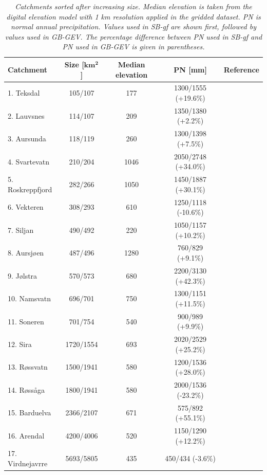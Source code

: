 \documentclass[12pt,a4paper,english]{article}
\begin{document}
\begin{table}[hbtp]
  \begin{tabular}{|l|c|c|c|c|}
    \hline
    \hline
    \textbf{Catchment} & \textbf{Size [$\mathbf{km^2}$] } & \textbf{Median elevation} & \textbf{PN [mm]} & \textbf{Reference} \\
	\hline
	1. Teksdal & 105/107 & 177 & 1300/1555 (+19.6\%) & \cite{Forland1997}\\
	\hline
	2. Lauvsnes & 114/107 & 209 & 1350/1380 (+2.2\%) & \cite{Isaksen2006}\\
	\hline
	3. Aursunda & 118/119 & 260 & 1300/1398 (+7.5\%) & \cite{Mamen2009}\\
	\hline
	4. Svartevatn & 210/204 & 1046 & 2050/2748 (+34.0\%) & \cite{Forland1991b} \\
	\hline
	5. Roskreppfjord & 282/266 & 1050 & 1450/1887 (+30.1\%) & \cite{Forland1991b}\\
	\hline
	6. Vekteren & 308/293 & 610 & 1250/1118 (-10.6\%) & \cite{Forland1991a}\\
	\hline
	7. Siljan & 490/492 & 220 & 1050/1157 (+10.2\%) & \cite{Forland1986b}\\
	\hline
	8. Aursj{\o}en & 487/496 & 1280 & 760/829 (+9.1\%) & \cite{Hanssen-Bauer1992}\\
	\hline
	9. J{\o}lstra & 570/573 & 680 & 2200/3130 (+42.3\%) & \cite{Forland1986a}\\
	\hline
	10. Namsvatn & 696/701 & 750 & 1300/1151 (+11.5\%) & \cite{Forland1991a}\\
	\hline
	11. Soneren & 701/754 & 540 & 900/989 (+9.9\%) & \cite{Hanssen-Bauer1991}\\
	\hline
	12. Sira & 1720/1554 & 693 & 2020/2529 (+25.2\%) & \cite{Forland1991b}\\
	\hline
	13. R{\o}ssvatn & 1500/1941 & 580 & 1200/1536 (+28.0\%) & \cite{Forland1988} \\
	\hline
	14. R{\o}ss{\aa}ga & 1800/1941 & 580 & 2000/1536 (-23.2\%) & \cite{Mamen2011b} \\
	\hline
	15. Barduelva & 2366/2107 & 671 & 575/892 (+55.1\%) & \cite{Forland1990b}\\
	\hline
	16. Arendal & 4200/4006 & 520 & 1150/1290 (+12.2\%) & \cite{Mamen2011a}\\
	\hline
	17. Virdnejavrre & 5693/5805 & 435 & 450/434 (-3.6\%) & \cite{Forland1994}\\
   \hline
   \hline
\end{tabular}
\caption[Areas]{\label{data:tab1}\sl Catchments sorted after increasing size. Median elevation is taken from the digital elevation model with 1 km resolution applied in the gridded dataset. PN is normal annual precipitation. Values used in SB-gf are shown first, followed by values used in GB-GEV. The percentage difference between PN used in SB-gf and PN used in GB-GEV is given in parentheses.}
\end{table}
\end{document}

